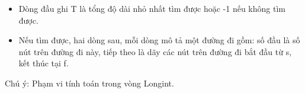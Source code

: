 \begin{itemize}
	\item Dòng đầu ghi T là tổng độ dài nhỏ nhất tìm được hoặc -1 nếu không tìm được.
	\item Nếu tìm được, hai dòng sau, mỗi dòng mô tả một đường đi gồm: số đầu là số nút trên đường đi này, tiếp theo là dãy các nút trên đường đi bắt đầu từ s, kết thúc tại f.
\end{itemize}

Chú ý: Phạm vi tính toán trong vòng Longint.